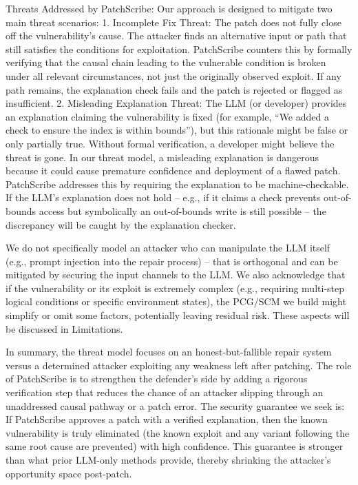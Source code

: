 \documentclass[conference,compsoc]{IEEEtran}
\begin{document}
Threats Addressed by PatchScribe: Our approach is designed to mitigate
two main threat scenarios: 1. Incomplete Fix Threat: The patch does not
fully close off the vulnerability's cause. The attacker finds an
alternative input or path that still satisfies the conditions for
exploitation. PatchScribe counters this by formally verifying that the
causal chain leading to the vulnerable condition is broken under all
relevant circumstances, not just the originally observed exploit. If any
path remains, the explanation check fails and the patch is rejected or
flagged as insufficient. 2. Misleading Explanation Threat: The LLM (or
developer) provides an explanation claiming the vulnerability is fixed
(for example, ``We added a check to ensure the index is within
bounds''), but this rationale might be false or only partially true.
Without formal verification, a developer might believe the threat is
gone. In our threat model, a misleading explanation is dangerous because
it could cause premature confidence and deployment of a flawed patch.
PatchScribe addresses this by requiring the explanation to be
machine-checkable. If the LLM's explanation does not hold -- e.g., if it
claims a check prevents out-of-bounds access but symbolically an
out-of-bounds write is still possible -- the discrepancy will be caught
by the explanation checker.

We do not specifically model an attacker who can manipulate the LLM
itself (e.g., prompt injection into the repair process) -- that is
orthogonal and can be mitigated by securing the input channels to the
LLM. We also acknowledge that if the vulnerability or its exploit is
extremely complex (e.g., requiring multi-step logical conditions or
specific environment states), the PCG/SCM we build might simplify or
omit some factors, potentially leaving residual risk. These aspects will
be discussed in Limitations.

In summary, the threat model focuses on an honest-but-fallible repair
system versus a determined attacker exploiting any weakness left after
patching. The role of PatchScribe is to strengthen the defender's side
by adding a rigorous verification step that reduces the chance of an
attacker slipping through an unaddressed causal pathway or a patch
error. The security guarantee we seek is: If PatchScribe approves a
patch with a verified explanation, then the known vulnerability is truly
eliminated (the known exploit and any variant following the same root
cause are prevented) with high confidence. This guarantee is stronger
than what prior LLM-only methods provide, thereby shrinking the
attacker's opportunity space post-patch.
\end{document}
